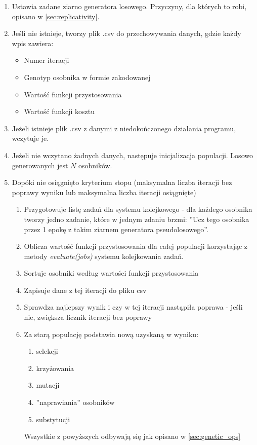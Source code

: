 \begin{enumerate}
  \item Ustawia zadane ziarno generatora losowego. Przyczyny, dla których to robi, opisano w \ref{sec:replicativity}.
  \item Jeśli nie istnieje, tworzy plik .csv do przechowywania danych, gdzie każdy wpis zawiera:
  \begin{itemize}
    \item Numer iteracji
    \item Genotyp osobnika w formie zakodowanej
    \item Wartość funkcji przystosowania
    \item Wartość funkcji kosztu
  \end{itemize}
  \item Jeżeli istnieje plik .csv z danymi z niedokończonego działania programu, wczytuje je.
  \item Jeżeli nie wczytano żadnych danych, następuje inicjalizacja populacji. Losowo generowanych jest $N$ osobników.
  \item Dopóki nie osiągnięto kryterium stopu (maksymalna liczba iteracji bez poprawy wyniku lub maksymalna liczba iteracji osiągnięte)
  \begin{enumerate}
    \item Przygotowuje listę zadań dla systemu kolejkowego - dla każdego osobnika tworzy jedno zadanie, które w jednym zdaniu brzmi: ''Ucz tego osobnika przez 1 epokę z takim ziarnem generatora pseudolosowego''.
    \item Oblicza wartość funkcji przystosowania dla całej populacji korzystając z metody \textit{evaluate(jobs)} systemu kolejkowania zadań.
    \item Sortuje osobniki według wartości funkcji przystosowania
    \item Zapisuje dane z tej iteracji do pliku csv
    \item Sprawdza najlepszy wynik i czy w tej iteracji nastąpiła poprawa - jeśli nie, zwiększa licznik iteracji bez poprawy
    \item Za starą populację podstawia nową uzyskaną w wyniku:
    \begin{enumerate}
      \item selekcji
      \item krzyżowania
      \item mutacji
      \item ''naprawiania'' osobników
      \item substytucji
    \end{enumerate}
    Wszystkie z powyższych odbywają się jak opisano w \ref{sec:genetic_ops}
  \end{enumerate}
\end{enumerate}


